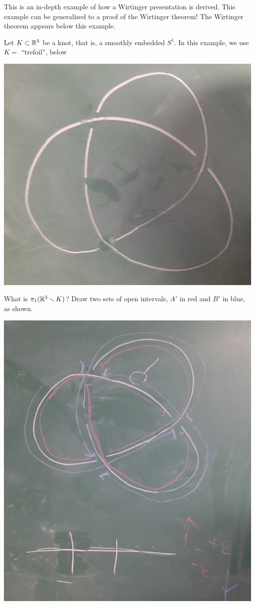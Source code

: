 \documentclass[11pt,leqno,oneside]{amsart}
\numberwithin{thm}{section}
\newcommand{\minus}{\smallsetminus}
\newcommand{\fund}{\pi_1}
\begin{document}
\begin{example}
  This is an in-depth example of how a Wirtinger presentation is derived.  This example can be generalized to a proof of the Wirtinger theorem!  The Wirtinger theorem appears below this example.

  Let $K \subset {\mathbb R}^3$ be a knot, that is, a smoothly embedded $S^1$.  In this example, we use $K =$ ``trefoil'', below

  \includegraphics[scale=0.15]{images/trefoil.jpg}

  What is $\fund(\R^3\minus K)$?  Draw two sets of open intervals, $A'$ in red and $B'$ in blue, as shown.

  \includegraphics[scale=0.2]{images/trefoil-with-red-and-blue.jpg}


\end{example}
\end{document}

